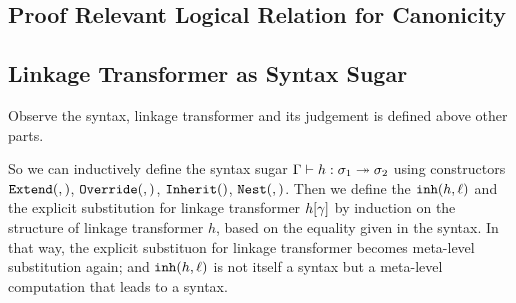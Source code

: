 


\subsection{Proof Relevant Logical Relation for Canonicity}


\subsection{Linkage Transformer as Syntax Sugar}
Observe the syntax, linkage transformer and its judgement is defined above 
other parts. 

So we can inductively define the syntax sugar $ {\Gamma} \vdash {h} : {\sigma_1} \twoheadrightarrow {\ensuremath{\sigma}_2}$ using constructors $\texttt{Extend}({},{})$, $\texttt{Override}({},{})$, $\texttt{Inherit}({})$, $\texttt{Nest}({},{})$. Then we define the $\texttt{inh}({h},{\ell})$ and the explicit substitution for linkage transformer ${h}\!\left[{\gamma}\right]$ by induction on the structure of linkage transformer $h$, based on the equality given in the syntax. In that way, the explicit substituon for linkage transformer becomes meta-level substitution again; and $\texttt{inh}({h},{\ell})$ is not itself a syntax but a meta-level computation that leads to a syntax.